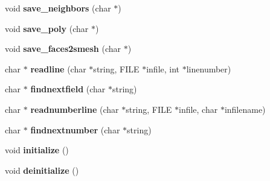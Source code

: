 \begin{DoxyCompactItemize}
\item 
\hypertarget{classtetgenio_a1b3b4554c3ddfe5c93860aa5630eb762}{void {\bfseries save\-\_\-neighbors} (char $\ast$)}\label{classtetgenio_a1b3b4554c3ddfe5c93860aa5630eb762}

\item 
\hypertarget{classtetgenio_ac512604429e7c754f3128a94133babdd}{void {\bfseries save\-\_\-poly} (char $\ast$)}\label{classtetgenio_ac512604429e7c754f3128a94133babdd}

\item 
\hypertarget{classtetgenio_a5f74cc6e1f7264c70049cde809b083e2}{void {\bfseries save\-\_\-faces2smesh} (char $\ast$)}\label{classtetgenio_a5f74cc6e1f7264c70049cde809b083e2}

\item 
\hypertarget{classtetgenio_a085af1b2c889a6545f6aab67aad1ba43}{char $\ast$ {\bfseries readline} (char $\ast$string, F\-I\-L\-E $\ast$infile, int $\ast$linenumber)}\label{classtetgenio_a085af1b2c889a6545f6aab67aad1ba43}

\item 
\hypertarget{classtetgenio_ad181a411db5dbcb1e11af7641e268bd5}{char $\ast$ {\bfseries findnextfield} (char $\ast$string)}\label{classtetgenio_ad181a411db5dbcb1e11af7641e268bd5}

\item 
\hypertarget{classtetgenio_a5e59fa66b5f0f4a7b7aa72df554ac1c7}{char $\ast$ {\bfseries readnumberline} (char $\ast$string, F\-I\-L\-E $\ast$infile, char $\ast$infilename)}\label{classtetgenio_a5e59fa66b5f0f4a7b7aa72df554ac1c7}

\item 
\hypertarget{classtetgenio_a9a30e99d63fb2288525cdbda2b887c38}{char $\ast$ {\bfseries findnextnumber} (char $\ast$string)}\label{classtetgenio_a9a30e99d63fb2288525cdbda2b887c38}

\item 
\hypertarget{classtetgenio_ac164a365a6a479bb31cd40443f5bd989}{void {\bfseries initialize} ()}\label{classtetgenio_ac164a365a6a479bb31cd40443f5bd989}

\item 
\hypertarget{classtetgenio_afcc5a8855570b36717070f3f47e3ef2a}{void {\bfseries deinitialize} ()}\label{classtetgenio_afcc5a8855570b36717070f3f47e3ef2a}

\end{DoxyCompactItemize}
